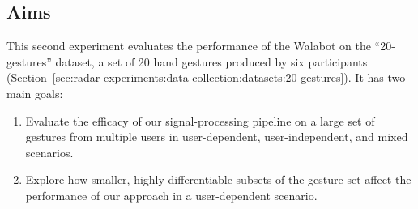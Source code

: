 \subsection{Aims} \label{sec:radar-experiments:gesture-subsets:aims}
This second experiment evaluates the performance of the Walabot on the ``20-gestures'' dataset, a set of 20 hand gestures produced by six participants (Section~\ref{sec:radar-experiments:data-collection:datasets:20-gestures}). It has two main goals:
\begin{enumerate}
    \item Evaluate the efficacy of our signal-processing pipeline on a large set of gestures from multiple users in user-dependent, user-independent, and mixed scenarios.
    \item Explore how smaller, highly differentiable subsets of the gesture set affect the performance of our approach in a user-dependent scenario.
\end{enumerate}



